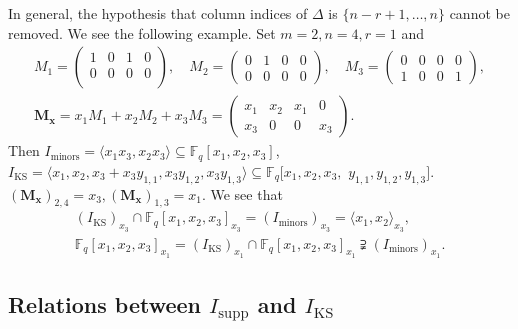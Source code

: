 \documentclass[a4paper, 11pt]{amsart}
\newcommand{\mr}[1]{\mathrm{#1}}
\newcommand{\ideala}[1]{\langle{#1}\rangle}
\newcommand{\td}[1]{\bm{#1}}
\newcommand{\tx}[1]{\text{#1}}
\newcommand{\fq}{\mathbb{F}_q}
\theoremstyle{definition}
\theoremstyle{definition}
\begin{document}
	In general, the hypothesis that column indices of $\Delta$ is $\{n-r+1,\dots,n\}$ cannot be removed. We see the following example. Set $m=2,n=4,r=1$ and
	\begin{gather*}
		M_1=\begin{pmatrix}
			1&0&1&0\\0&0&0&0\\
		\end{pmatrix},\quad
		M_2=\begin{pmatrix}
			0&1&0&0\\
			0&0&0&0
		\end{pmatrix},\quad
		M_3=\begin{pmatrix}
			0&0&0&0\\
			1&0&0&1	\end{pmatrix},\\
		\td{M_x}=x_1M_1+x_2M_2+x_3M_3=\begin{pmatrix}
			x_1&x_2&x_1&0\\
			x_3&0&0&x_3
		\end{pmatrix}.
	\end{gather*}
	Then $I_{\tx{minors}}=\ideala{x_1x_3,x_2x_3}\subseteq \fq[x_1,x_2,x_3]$, $I_{\tx{KS}}=\ideala{x_1,x_2,x_3+x_3y_{1,1},x_3y_{1,2},x_3y_{1,3}}\subseteq\fq[x_1,x_2,x_3,$ $y_{1,1},y_{1,2},y_{1,3}]$. $(\td{M_x})_{2,4}=x_3,(\td{M_x})_{1,3}=x_1$. We see that
	\begin{gather*}
		(I_{\tx{KS}})_{x_3}\cap \fq[x_1,x_2,x_3]_{x_3}=(I_{\tx{minors}})_{x_3}=\ideala{x_1,x_2}_{x_3},\\
		\fq[x_1,x_2,x_3]_{x_1}=(I_{\tx{KS}})_{x_1}\cap \fq[x_1,x_2,x_3]_{x_1}\supsetneqq (I_{\tx{minors}})_{x_1}.
	\end{gather*}
	\subsection{Relations between $I_{\mr{supp}}$ and $I_{\mr{KS}}$}\,
	
\end{document}
